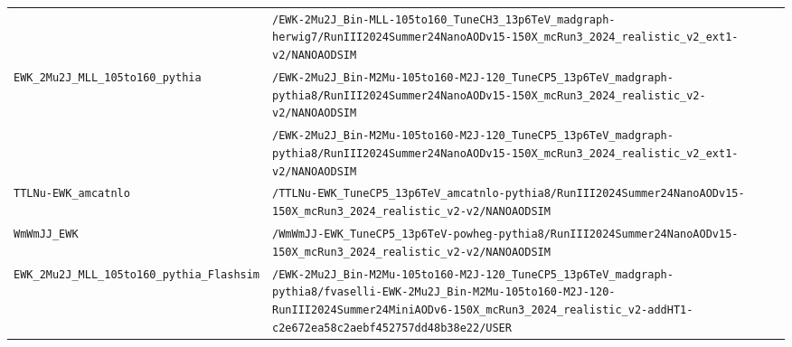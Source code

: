 \begin{longtable}{@{}>{\RaggedRight\arraybackslash}p{} >{\RaggedRight\arraybackslash}p{}@{}}
 & \texttt{/\allowbreak{}EWK-\allowbreak{}2Mu2J\_\allowbreak{}Bin-\allowbreak{}MLL-\allowbreak{}105to160\_\allowbreak{}TuneCH3\_\allowbreak{}13p6TeV\_\allowbreak{}madgraph-\allowbreak{}herwig7/\allowbreak{}RunIII2024Summer24NanoAODv15-\allowbreak{}150X\_\allowbreak{}mcRun3\_\allowbreak{}2024\_\allowbreak{}realistic\_\allowbreak{}v2\_\allowbreak{}ext1-\allowbreak{}v2/\allowbreak{}NANOAODSIM} \\
\addlinespace[2pt]
\texttt{EWK\_\allowbreak{}2Mu2J\_\allowbreak{}MLL\_\allowbreak{}105to160\_\allowbreak{}pythia} & \texttt{/\allowbreak{}EWK-\allowbreak{}2Mu2J\_\allowbreak{}Bin-\allowbreak{}M2Mu-\allowbreak{}105to160-\allowbreak{}M2J-\allowbreak{}120\_\allowbreak{}TuneCP5\_\allowbreak{}13p6TeV\_\allowbreak{}madgraph-\allowbreak{}pythia8/\allowbreak{}RunIII2024Summer24NanoAODv15-\allowbreak{}150X\_\allowbreak{}mcRun3\_\allowbreak{}2024\_\allowbreak{}realistic\_\allowbreak{}v2-\allowbreak{}v2/\allowbreak{}NANOAODSIM} \\
 & \texttt{/\allowbreak{}EWK-\allowbreak{}2Mu2J\_\allowbreak{}Bin-\allowbreak{}M2Mu-\allowbreak{}105to160-\allowbreak{}M2J-\allowbreak{}120\_\allowbreak{}TuneCP5\_\allowbreak{}13p6TeV\_\allowbreak{}madgraph-\allowbreak{}pythia8/\allowbreak{}RunIII2024Summer24NanoAODv15-\allowbreak{}150X\_\allowbreak{}mcRun3\_\allowbreak{}2024\_\allowbreak{}realistic\_\allowbreak{}v2\_\allowbreak{}ext1-\allowbreak{}v2/\allowbreak{}NANOAODSIM} \\
\addlinespace[2pt]
\texttt{TTLNu-\allowbreak{}EWK\_\allowbreak{}amcatnlo} & \texttt{/\allowbreak{}TTLNu-\allowbreak{}EWK\_\allowbreak{}TuneCP5\_\allowbreak{}13p6TeV\_\allowbreak{}amcatnlo-\allowbreak{}pythia8/\allowbreak{}RunIII2024Summer24NanoAODv15-\allowbreak{}150X\_\allowbreak{}mcRun3\_\allowbreak{}2024\_\allowbreak{}realistic\_\allowbreak{}v2-\allowbreak{}v2/\allowbreak{}NANOAODSIM} \\
\addlinespace[2pt]
\texttt{WmWmJJ\_\allowbreak{}EWK} & \texttt{/\allowbreak{}WmWmJJ-\allowbreak{}EWK\_\allowbreak{}TuneCP5\_\allowbreak{}13p6TeV-\allowbreak{}powheg-\allowbreak{}pythia8/\allowbreak{}RunIII2024Summer24NanoAODv15-\allowbreak{}150X\_\allowbreak{}mcRun3\_\allowbreak{}2024\_\allowbreak{}realistic\_\allowbreak{}v2-\allowbreak{}v2/\allowbreak{}NANOAODSIM} \\
\addlinespace[2pt]
\texttt{EWK\_\allowbreak{}2Mu2J\_\allowbreak{}MLL\_\allowbreak{}105to160\_\allowbreak{}pythia\_\allowbreak{}Flashsim} & \texttt{/\allowbreak{}EWK-\allowbreak{}2Mu2J\_\allowbreak{}Bin-\allowbreak{}M2Mu-\allowbreak{}105to160-\allowbreak{}M2J-\allowbreak{}120\_\allowbreak{}TuneCP5\_\allowbreak{}13p6TeV\_\allowbreak{}madgraph-\allowbreak{}pythia8/\allowbreak{}fvaselli-\allowbreak{}EWK-\allowbreak{}2Mu2J\_\allowbreak{}Bin-\allowbreak{}M2Mu-\allowbreak{}105to160-\allowbreak{}M2J-\allowbreak{}120-\allowbreak{}RunIII2024Summer24MiniAODv6-\allowbreak{}150X\_\allowbreak{}mcRun3\_\allowbreak{}2024\_\allowbreak{}realistic\_\allowbreak{}v2-\allowbreak{}addHT1-\allowbreak{}c2e672ea58c2aebf452757dd48b38e22/\allowbreak{}USER} \\

\end{longtable}
